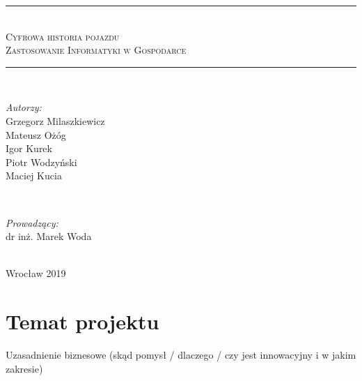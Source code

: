 \documentclass[12pt]{article}
\begin{document}
\begin{titlepage}
\newcommand{\LINE}{\rule{\linewidth}{0.7mm}}
\center
\LINE \\[0.5cm]
\Huge\textsc{Cyfrowa historia pojazdu}\\ [5mm]
\normalsize\textsc{Zastosowanie Informatyki w Gospodarce}  \\[0.5cm]
\LINE \\[3cm]
\begin{minipage}{0.5\textwidth}
\begin{flushleft} \large
\emph{Autorzy:}
		\\Grzegorz Milaszkiewicz %
		\\Mateusz Ożóg %
		\\Igor Kurek
		\\Piotr Wodzyński
		\\Maciej Kucia 
\end{flushleft}
\end{minipage}
~
\begin{minipage}{0.45\textwidth}
\begin{flushright} \large
\emph{Prowadzący:} \\
dr inż. Marek Woda
\end{flushright}
\end{minipage}\\[2cm]
\vfill
\center Wrocław 2019
\end{titlepage}

\renewcommand{\contentsname}{Spis treści}
\tableofcontents
\newpage

\section{Temat projektu}
Uzasadnienie biznesowe (skąd pomysł / dlaczego / czy jest innowacyjny i w jakim zakresie)



\newpage
\end{document}
